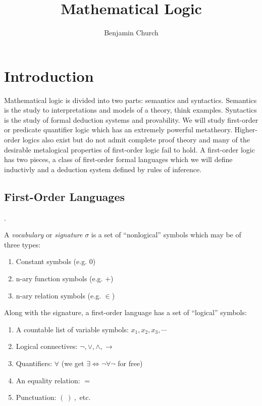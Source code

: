 \documentclass[12pt]{article}
\newenvironment{definition}[1][Definition:]{\begin{trivlist}
\item[\hskip \labelsep {\bfseries #1}]}{\end{trivlist}}
\theoremstyle{theorem}
\theoremstyle{definition}
\theoremstyle{definition}
\theoremstyle{remark}
\theoremstyle{definition}
\theoremstyle{remark}
\begin{document}
\author{Benjamin Church}
\title{\Huge Mathematical Logic}

\maketitle
\tableofcontents
\newpage


\section{Introduction}

Mathematical logic is divided into two parts: semantics and syntactics. Semantics is the study to interpretations and models of a theory, think examples. Syntactics is the study of formal deduction systems and provability. We will study first-order or predicate quantifier logic which has an extremely powerful metatheory. Higher-order logics also exist but do not admit complete proof theory and many of the desirable metalogical properties of first-order logic fail to hold. A first-order logic has two pieces, a class of first-order formal languages which we will define inductivly and a deduction system defined by rules of inference.

\subsection{First-Order Languages}.

\begin{definition}
A \textit{vocabulary} or \textit{signature} $\sigma$ is a set of ``nonlogical'' symbols which may be of three types:
\begin{enumerate}
\item Constant symbols (e.g. $0$)
\item n-ary function symbols (e.g. $+$)
\item n-ary relation symbols (e.g. $\in$)
\end{enumerate}
Along with the signature, a first-order language has a set of ``logical'' symbols:
\begin{enumerate}
\item A countable list of variable symbols: $x_1, x_2, x_3, \cdots$
\item Logical connectives: $\neg, \vee, \wedge, \to$
\item Quantifiers: $\forall$ (we get $\exists \iff \neg \forall \neg$ for free)
\item An equality relation: $=$
\item Punctuation: $( \: ) \: ,$ etc.
\end{enumerate}
\end{definition}
\end{document}
